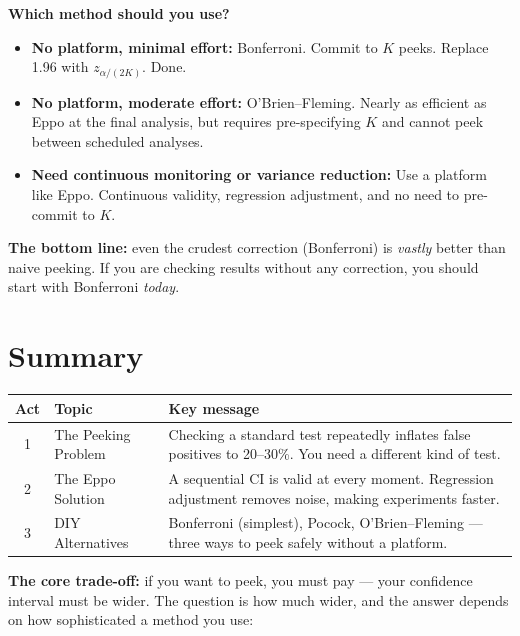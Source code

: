 \documentclass[12pt, a4paper]{article}
\begin{document}
\begin{keytakeaway}
\textbf{Which method should you use?}
\begin{itemize}[nosep]
  \item \textbf{No platform, minimal effort:} Bonferroni.  Commit to $K$
        peeks.  Replace 1.96 with $z_{\alpha/(2K)}$.  Done.
  \item \textbf{No platform, moderate effort:} O'Brien--Fleming.  Nearly as
        efficient as Eppo at the final analysis, but requires pre-specifying
        $K$ and cannot peek between scheduled analyses.
  \item \textbf{Need continuous monitoring or variance reduction:} Use a
        platform like Eppo.  Continuous validity, regression adjustment, and
        no need to pre-commit to $K$.
\end{itemize}

\textbf{The bottom line:} even the crudest correction (Bonferroni) is
\emph{vastly} better than naive peeking.  If you are checking results
without any correction, you should start with Bonferroni \emph{today}.
\end{keytakeaway}


\newpage
\section{Summary}

\begin{center}
\renewcommand{\arraystretch}{1.3}
\begin{tabular}{@{} c l p{8cm} @{}}
\toprule
\textbf{Act} & \textbf{Topic} & \textbf{Key message} \\
\midrule
1 & The Peeking Problem
  & Checking a standard test repeatedly inflates false positives to
    20--30\%.  You need a different kind of test. \\
2 & The Eppo Solution
  & A sequential CI is valid at every moment.  Regression adjustment
    removes noise, making experiments faster. \\
3 & DIY Alternatives
  & Bonferroni (simplest), Pocock, O'Brien--Fleming --- three ways to
    peek safely without a platform. \\
\bottomrule
\end{tabular}
\end{center}

\bigskip
\textbf{The core trade-off:} if you want to peek, you must pay --- your
confidence interval must be wider.  The question is how much wider, and the
answer depends on how sophisticated a method you use:
\end{document}
